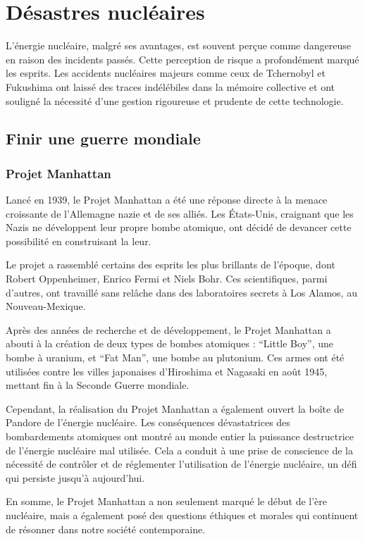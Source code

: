 \chapter{Désastres nucléaires}

L’énergie nucléaire, malgré ses avantages, est souvent perçue comme dangereuse en raison des incidents passés. Cette perception de risque a profondément marqué les esprits. Les accidents nucléaires majeurs comme ceux de Tchernobyl et Fukushima ont laissé des traces indélébiles dans la mémoire collective et ont souligné la nécessité d'une gestion rigoureuse et prudente de cette technologie.

\section{Finir une guerre mondiale}

\subsection{Projet Manhattan}

Lancé en 1939, le Projet Manhattan a été une réponse directe à la menace croissante de l’Allemagne nazie et de ses alliés. Les États-Unis, craignant que les Nazis ne développent leur propre bombe atomique, ont décidé de devancer cette possibilité en construisant la leur.

Le projet a rassemblé certains des esprits les plus brillants de l’époque, dont Robert Oppenheimer, Enrico Fermi et Niels Bohr. Ces scientifiques, parmi d’autres, ont travaillé sans relâche dans des laboratoires secrets à Los Alamos, au Nouveau-Mexique.

Après des années de recherche et de développement, le Projet Manhattan a abouti à la création de deux types de bombes atomiques : “Little Boy”, une bombe à uranium, et “Fat Man”, une bombe au plutonium. Ces armes ont été utilisées contre les villes japonaises d’Hiroshima et Nagasaki en août 1945, mettant fin à la Seconde Guerre mondiale.

Cependant, la réalisation du Projet Manhattan a également ouvert la boîte de Pandore de l’énergie nucléaire. Les conséquences dévastatrices des bombardements atomiques ont montré au monde entier la puissance destructrice de l’énergie nucléaire mal utilisée. Cela a conduit à une prise de conscience de la nécessité de contrôler et de réglementer l’utilisation de l’énergie nucléaire, un défi qui persiste jusqu’à aujourd’hui.

En somme, le Projet Manhattan a non seulement marqué le début de l’ère nucléaire, mais a également posé des questions éthiques et morales qui continuent de résonner dans notre société contemporaine.

